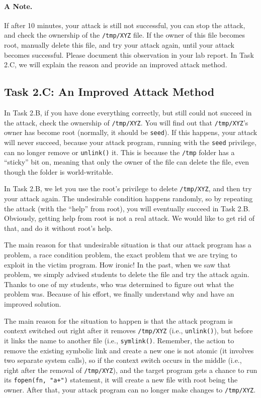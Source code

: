 \paragraph{A Note.}
If after 10 minutes, your attack is still not 
successful, you can stop the attack, and check the ownership
of the \texttt{/tmp/XYZ} file. If the owner of this file
becomes root, manually delete this file, and try your 
attack again, until your attack becomes successful. 
Please document this observation in your lab report. 
In Task 2.C, we will explain the reason and provide
an improved attack method. 



\subsection{Task 2.C: An Improved Attack Method}

In Task 2.B, if you have done everything correctly, but still could not succeed
in the attack, check the ownership of \texttt{/tmp/XYZ}. You will find out    
that \texttt{/tmp/XYZ}'s owner has become root (normally, it should be \texttt{seed}). 
If this happens, your attack will never succeed, because your attack
program, running with the \texttt{seed} privilege, can no longer remove or
\texttt{unlink()} it.  
This is because the \texttt{/tmp}
folder has a ``sticky'' bit on, meaning that only the owner of the file can
delete the file, even though the folder is world-writable. 


In Task 2.B, we let you use the root's privilege to delete \texttt{/tmp/XYZ}, 
and then try your attack again. The undesirable condition happens randomly,
so by repeating the attack (with the ``help'' from root), you will eventually
succeed in Task 2.B. Obviously, getting help from root is not a real attack. 
We would like to get rid of that, and do it without root's help.


The main reason for that undesirable situation is that 
our attack program has a problem, a race condition problem, the exact problem that
we are trying to exploit in the victim program. How ironic!  
In the past, when we saw that problem, we simply advised students to 
delete the file and try the attack again. Thanks to one of my students, 
who was determined to figure out what the problem was. Because of his effort,
we finally understand why and have an improved solution. 


The main reason for the situation to happen is that the attack program is 
context switched out right after it removes {\tt /tmp/XYZ} (i.e., \texttt{unlink()}),
but before it links the name to another file (i.e., \texttt{symlink()}. 
Remember, the action to remove the existing 
symbolic link and create a new one is not atomic (it involves two 
separate system calls), so if the context switch occurs in the middle
(i.e., right after the removal of {\tt /tmp/XYZ}),
and the target \setuid program gets a chance to run its 
{\tt fopen(fn, "a+")} statement, it will create a new file with root being the owner.
After that, your attack program can no longer make changes to {\tt /tmp/XYZ}.


